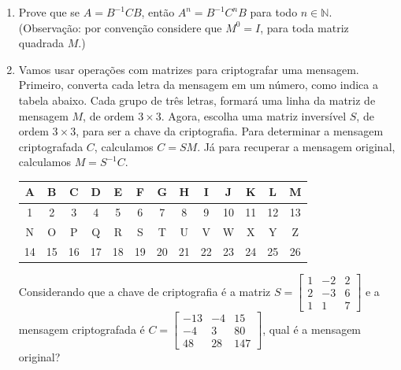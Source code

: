 \documentclass[12pt,a4paper]{article}
\begin{document}
\begin{enumerate}
  \item  Prove que se $A = B^{-1}CB$, então $A^n = B^{-1}C^nB$ para todo $n\in\mathbb{N}$.
    (Observação: por convenção considere que $M^0=I$, para toda matriz quadrada $M$.)

  \item Vamos usar operações com matrizes para criptografar uma mensagem.
    Primeiro, converta cada letra da mensagem em um número, como indica
    a tabela abaixo. Cada grupo de três letras, formará uma linha da matriz
    de mensagem $M$, de ordem $3\times3$. Agora, escolha uma matriz
    inversível $S$, de ordem $3\times3$, para ser a chave da criptografia.
    Para determinar a mensagem criptografada $C$, calculamos $C=SM$.
    Já para recuperar a mensagem original, calculamos $M=S^{-1}C$.

    \begin{center}
      \begin{tabular}{|c|c|c|c|c|c|c|c|c|c|c|c|c|}
      \hline 
      A & B & C & D & E & F & G & H & I & J & K & L & M\\
      \hline 
      1 & 2 & 3 & 4 & 5 & 6 & 7 & 8 & 9 & 10 & 11 & 12 & 13\\
      \hline 
      \hline 
      N & O & P & Q & R & S & T & U & V & W & X & Y & Z\\
      \hline 
      14 & 15 & 16 & 17 & 18 & 19 & 20 & 21 & 22 & 23 & 24 & 25 & 26\\
      \hline 
      \end{tabular}
  \end{center}

  Considerando que a chave de criptografia é a matriz
    $S=\begin{bmatrix}
      1 & -2 & 2\\
      2 & -3 & 6\\
      1 & 1 & 7
    \end{bmatrix}$ e a mensagem criptografada é
    $C=\begin{bmatrix}
      -13 & -4 & 15 \\
      -4 & 3 & 80 \\
      48 & 28 & 147
      \end{bmatrix}$, qual é a mensagem original?
\end{enumerate}
\end{document}
